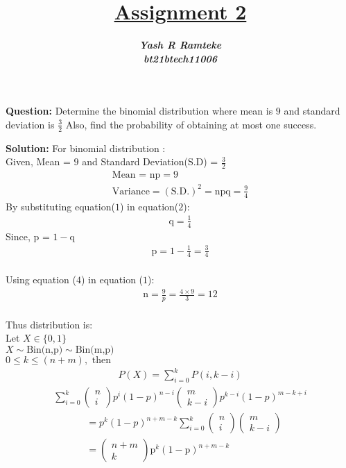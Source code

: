 \documentclass[journal,12pt,twocolumn]{IEEEtran}
\title{\textbf{\underline{Assignment 2}}}
\author{\textbf{\textit{Yash R Ramteke}}\\
\textbf{\textit{bt21btech11006}}}
\begin{document}
\maketitle

\textbf{Question:}
Determine the binomial distribution where mean is $9$ and standard deviation is $\frac{3}{2}$ Also, find the probability of obtaining at most one success.

\bigskip
\textbf{Solution:}
For binomial distribution :\\
Given, Mean = $9$ and Standard Deviation(S.D) = $\frac{3}{2}$
\begin{align}
    \text{Mean = np} = 9
    \\
    \text{Variance} = (\text{S.D.})^{2} = \text{npq} = \frac{9}{4}
\end{align}
By substituting equation($1$) in equation($2$):
\begin{align}
      \text{q} = \frac{1}{4}
\end{align}
Since, p = $1 -$q
\begin{align}
      \text{p} = 1 - \frac{1}{4} = \frac{3}{4} 
\end{align}\\
Using equation ($4$) in equation ($1$):
\begin{align}
      \text{n} = \frac{9}{p} = \frac{4\times9}{3} = 12
\end{align}\\
Thus distribution is:\\
 Let $X\in\{0,1\}$ \\
$X\sim \text{Bin(n,p)}\sim \text{Bin(m,p)}$\\ 
 $0\leq k \leq (n+m),\text{ then}$\\
\begin{align}
 P(X) = \sum_{i=0}^{k}P(i,k-i)
\end{align}
\begin{align}
\sum_{i=0}^{k}\left(\begin{array}{ll}
    n\\
    i
    \end{array}\right){p}^i(1-p)^{n-i} \left(\begin{array}{ll}
    m\\
    k-i
    \end{array}\right)p^{k-i}(1-p)^{m-k+i}
\end{align}
\begin{align}
    &= p^k(1-p)^{n+m-k}\sum_{i=0}^{k}\left(\begin{array}{cc}
    n\\
    i
    \end{array}\right)\left(\begin{array}{ll}
    m\\
    k-i
    \end{array}\right)\\
&= \left(\begin{array}{cc}
    n+m\\
    k
    \end{array}\right) \text{p}^k \left(1-\text{p}\right)^{n+m-k}
\end{align}
\end{document}
